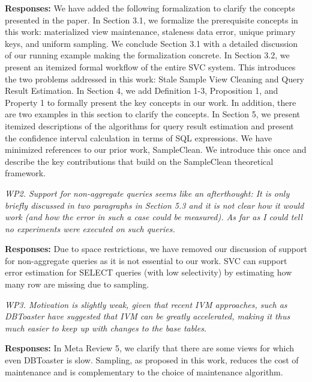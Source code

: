 \vspace{.25em}

{\bf Responses:} We have added the following formalization to clarify the concepts presented in the paper. In Section 3.1, we formalize the prerequisite concepts in this work: materialized view maintenance, staleness data error, unique primary keys, and uniform sampling. We conclude Section 3.1 with a detailed discussion of our running example making the formalization concrete. In Section 3.2, we present an itemized formal workflow of the entire SVC system. This introduces the two problems addressed in this work: Stale Sample View Cleaning and Query Result Estimation. In Section 4, we add Definition 1-3, Proposition 1, and Property 1 to formally present the key concepts in our work. In addition, there are two examples in this section to clarify the concepts. In Section 5, we present itemized descriptions of the algorithms for query result estimation and present the confidence interval calculation in terms of SQL expressions. We have minimized references to our prior work, SampleClean. We introduce this once and describe the key contributions that build on the SampleClean theoretical framework.

\vspace{1em}
\emph{WP2. Support for non-aggregate queries seems like an afterthought: It is only briefly discussed in two paragraphs in Section 5.3 and it is not clear how it would work (and how the error in such a case could be measured). As far as I could tell no experiments were executed on such queries.}

\vspace{.25em}

{\bf Responses:} Due to space restrictions, we have removed our discussion of support for non-aggregate queries as it is not essential to our work. SVC can support error estimation for SELECT queries (with low selectivity) by estimating how many row are missing due to sampling.

\vspace{1em}
\emph{WP3. Motivation is slightly weak, given that recent IVM approaches, such as DBToaster have suggested that IVM can be greatly accelerated, making it thus much easier to keep up with changes to the base tables.}

\vspace{.25em}

{\bf Responses:} In Meta Review 5, we clarify that there are some views for which even DBToaster is slow. Sampling, as proposed in this work, reduces the cost of maintenance and is complementary to the choice of maintenance algorithm.

